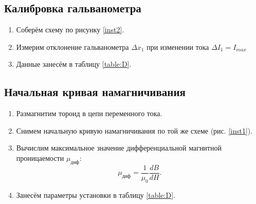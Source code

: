 \documentclass[a4paper,12pt]{article}
\begin{document}
		\subsection*{Калибровка гальванометра}
			\begin{enumerate}
				\item Соберём схему по рисунку \ref{inst2}.
				\item Измерим отклонение гальванометра $ \Delta x_1 $ при изменении тока $ \Delta I_1 = I_{max} $
				\item Данные занесём в таблицу \ref{table:D}.
			\end{enumerate}
		\subsection*{Начальная кривая намагничивания}
			\begin{enumerate}
				\item Размагнитим тороид в цепи переменного тока.
				\item Снимем начальную кривую намагничивания по той же схеме (рис. \ref{inst1}).
				\item Вычислим максимальное значение дифференциальной магнитной проницаемости $\mu_{диф}$:
				\begin{equation}
					\mu_{диф} = \frac{1}{\mu_0}\frac{dB}{dH}.
				\end{equation}
				\item Занесём параметры установки в таблицу \ref{table:D}.
			\end{enumerate}
			
\end{document}
